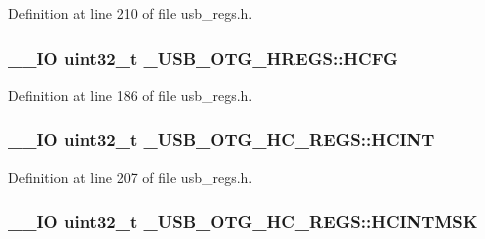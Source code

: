 Definition at line 210 of file usb\-\_\-regs.\-h.

\hypertarget{group___u_s_b___o_t_g___d_r_i_v_e_r_gac1e2d946a7649660bdb5b24442411b9a}{
\subsubsection[{H\-C\-F\-G}]{\setlength{\rightskip}{0pt plus 5cm}\-\_\-\-\_\-\-I\-O {\bf uint32\-\_\-t} \-\_\-\-U\-S\-B\-\_\-\-O\-T\-G\-\_\-\-H\-R\-E\-G\-S\-::\-H\-C\-F\-G}}\label{group___u_s_b___o_t_g___d_r_i_v_e_r_gac1e2d946a7649660bdb5b24442411b9a}


Definition at line 186 of file usb\-\_\-regs.\-h.

\hypertarget{group___u_s_b___o_t_g___d_r_i_v_e_r_ga10ac581956332a3dca2b9ba7ea05230f}{
\subsubsection[{H\-C\-I\-N\-T}]{\setlength{\rightskip}{0pt plus 5cm}\-\_\-\-\_\-\-I\-O {\bf uint32\-\_\-t} \-\_\-\-U\-S\-B\-\_\-\-O\-T\-G\-\_\-\-H\-C\-\_\-\-R\-E\-G\-S\-::\-H\-C\-I\-N\-T}}\label{group___u_s_b___o_t_g___d_r_i_v_e_r_ga10ac581956332a3dca2b9ba7ea05230f}


Definition at line 207 of file usb\-\_\-regs.\-h.

\hypertarget{group___u_s_b___o_t_g___d_r_i_v_e_r_ga2dbe5f6d3aa6e195d2aaeb0bc2065d24}{
\subsubsection[{H\-C\-I\-N\-T\-M\-S\-K}]{\setlength{\rightskip}{0pt plus 5cm}\-\_\-\-\_\-\-I\-O {\bf uint32\-\_\-t} \-\_\-\-U\-S\-B\-\_\-\-O\-T\-G\-\_\-\-H\-C\-\_\-\-R\-E\-G\-S\-::\-H\-C\-I\-N\-T\-M\-S\-K}}\label{group___u_s_b___o_t_g___d_r_i_v_e_r_ga2dbe5f6d3aa6e195d2aaeb0bc2065d24}


